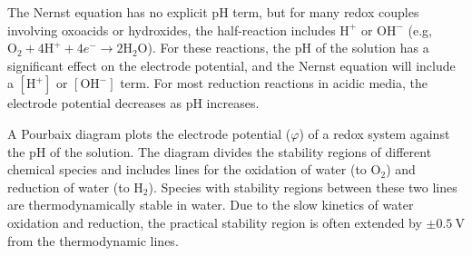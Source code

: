 The Nernst equation has no explicit pH term, but for many redox couples involving oxoacids or hydroxides, the half-reaction includes $\text{H}^+$ or $\text{OH}^-$ (e.g, $\text{O}_2 + 4\text{H}^+ + 4e^- \to 2\text{H}_2\text{O}$). For these reactions, the pH of the solution has a significant effect on the electrode potential, and the Nernst equation will include a $[\text{H}^+]$ or $[\text{OH}^-]$ term. For most reduction reactions in acidic media, the electrode potential decreases as pH increases.

\begin{definition}
A Pourbaix diagram plots the electrode potential ($\varphi$) of a redox system against the pH of the solution. The diagram divides the stability regions of different chemical species and includes lines for the oxidation of water (to $\text{O}_2$) and reduction of water (to $\text{H}_2$). Species with stability regions between these two lines are thermodynamically stable in water. Due to the slow kinetics of water oxidation and reduction, the practical stability region is often extended by $\pm 0.5\ \mathrm{V}$ from the thermodynamic lines.
\end{definition}

